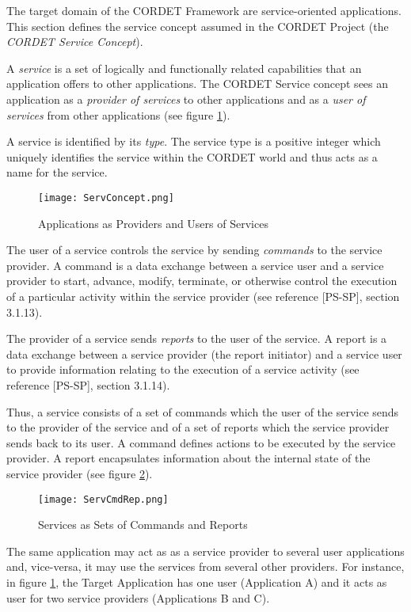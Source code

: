 The target domain of the CORDET Framework are service-oriented applications. 
This section defines the service concept assumed in the CORDET Project (the \textit{CORDET Service Concept}).

A \textit{service} is a set of logically and functionally related capabilities that an application offers to other applications. 
The CORDET Service concept sees an application as a \textit{provider of services} to other applications and as a \textit{user of services} from other applications (see figure \ref{fig:ServConcept}).

A service is identified by its \textit{type}. 
The service type is a positive integer which uniquely identifies the service within the CORDET world and thus acts as a name for the service.

\begin{figure}[ht]
 \centering
 \texttt{[image: ServConcept.png]}
 \caption{Applications as Providers and Users of Services}
 \label{fig:ServConcept}
\end{figure}

The user of a service controls the service by sending \textit{commands} to the service provider. 
A command is a data exchange between a service user and a service provider to start, advance, modify, terminate, or otherwise control the execution of a particular activity within the service provider (see reference [PS-SP], section 3.1.13). 

The provider of a service sends \textit{reports} to the user of the service. 
A report is a data exchange between a service provider (the report initiator) and a service user to provide information relating to the execution of a service activity (see reference [PS-SP], section 3.1.14).

Thus, a service consists of a set of commands which the user of the service sends to the provider of the service and of a set of reports which the service provider sends back to its user. 
A command defines actions to be executed by the service provider. 
A report encapsulates information about the internal state of the service provider (see figure \ref{fig:ServCmdRep}).

\begin{figure}[ht]
 \centering
 \texttt{[image: ServCmdRep.png]}
 \caption{Services as Sets of Commands and Reports}
 \label{fig:ServCmdRep}
\end{figure}

The same application may act as as a service provider to several user applications and, vice-versa, it may use the services from several other providers. For instance, in figure \ref{fig:ServConcept}, the Target Application has one user (Application A) and it acts as user for two service providers (Applications B and C). 

